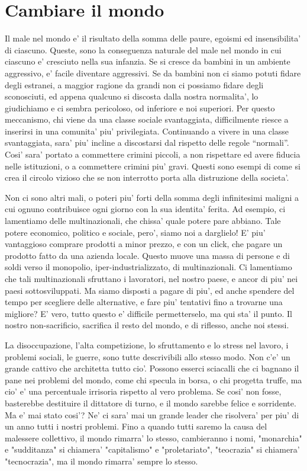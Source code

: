\chapter{Cambiare il mondo}

Il male nel mondo e' il risultato della somma delle paure, egoismi ed insensibilita' di ciascuno. Queste, sono la conseguenza naturale del male nel mondo in cui ciascuno e' cresciuto nella sua infanzia. Se si cresce da bambini in un ambiente aggressivo, e' facile diventare aggressivi. Se da bambini non ci siamo potuti fidare degli estranei, a maggior ragione da grandi non ci possiamo fidare degli sconosciuti, ed appena qualcuno si discosta dalla nostra normalita', lo giudichiamo e ci sembra pericoloso, od inferiore e noi superiori. Per questo meccanismo, chi viene da una classe sociale svantaggiata, difficilmente riesce a inserirsi in una comunita' piu' privilegiata. Continuando a vivere in una classe svantaggiata, sara' piu' incline a discostarsi dal rispetto delle regole ``normali''. Cosi' sara' portato a commettere crimini piccoli, a non rispettare ed avere fiducia nelle istituzioni, o a commettere crimini piu' gravi. Questi sono esempi di come si crea il circolo vizioso che se non interrotto porta alla distruzione della societa'.

Non ci sono altri mali, o poteri piu' forti della somma degli infinitesimi maligni a cui ognuno contribuisce ogni giorno con la sua identita' ferita. Ad esempio, ci lamentiamo delle multinazionali, che chissa' quale potere pare abbiano. Tale potere economico, politico e sociale, pero', siamo noi a darglielo! E' piu' vantaggioso comprare prodotti a minor prezzo, e con un click, che pagare un prodotto fatto da una azienda locale. Questo muove una massa di persone e di soldi verso il monopolio, iper-industrializzato, di multinazionali. Ci lamentiamo che tali multinazionali sfruttano i lavoratori, nel nostro paese, e ancor di piu' nei paesi sottosviluppati. Ma siamo disposti a pagare di piu', ed anche spendere del tempo per scegliere delle alternative, e fare piu' tentativi fino a trovarne una migliore? E' vero, tutto questo e' difficile permetterselo, ma qui sta' il punto. Il nostro non-sacrificio, sacrifica il resto del mondo, e di riflesso, anche noi stessi.

La disoccupazione, l'alta competizione, lo sfruttamento e lo stress nel lavoro, i problemi sociali, le guerre, sono tutte descrivibili allo stesso modo. Non c'e' un grande cattivo che architetta tutto cio'. Possono esserci sciacalli che ci bagnano il pane nei problemi del mondo, come chi specula in borsa, o chi progetta truffe, ma cio' e' una percentuale irrisoria rispetto al vero problema. Se cosi' non fosse, basterebbe destituire il dittatore di turno, e il mondo sarebbe felice e sorridente. Ma e' mai stato cosi'? Ne' ci sara' mai un grande leader che risolvera' per piu' di un anno tutti i nostri problemi. Fino a quando tutti saremo la causa del malessere collettivo, il mondo rimarra' lo stesso, cambieranno i nomi, "monarchia" e "sudditanza" si chiamera' "capitalismo" e "proletariato", "teocrazia" si chiamera' "tecnocrazia", ma il mondo rimarra' sempre lo stesso.


